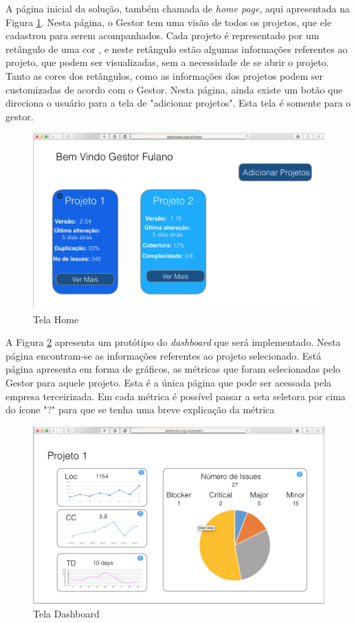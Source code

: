 A página inicial da solução, também chamada de \textit{home page}, aqui apresentada na Figura \ref{img:telaHome}. Nesta página, o Gestor tem uma visão de todos os projetos, que ele cadastrou para serem acompanhados. Cada projeto é representado por um retângulo de uma cor , e neste retângulo estão algumas informações referentes ao projeto, que podem ser visualizadas, sem a necessidade de se abrir o projeto. Tanto as cores dos retângulos, como as informações dos projetos podem ser customizadas de acordo com o Gestor. Nesta página, ainda existe um botão que direciona o usuário para a tela de "adicionar projetos". Esta tela é somente para o gestor.
 
\graphicspath{{figuras/}}
\begin{figure}
\centering
\includegraphics[scale=0.60]{telaHome2.png}
\caption{Tela Home}
\label{img:telaHome}
\end{figure} 

A Figura \ref{img:telaDashboard} apresenta um protótipo do \textit{dashboard} que será implementado. Nesta página encontram-se as informações referentes ao projeto selecionado. Está página apresenta em forma de gráficos, as métricas que foram selecionadas pelo Gestor para aquele projeto. Esta é a única página que pode ser acessada pela empresa terceirizada. Em cada métrica é possível passar a seta seletora por cima do ícone "?" para que se tenha uma breve explicação da métrica 

\graphicspath{{figuras/}}
\begin{figure}
\centering
\includegraphics[scale=0.60]{telaDashboard.png}
\caption{Tela Dashboard}
\label{img:telaDashboard}
\end{figure} 

